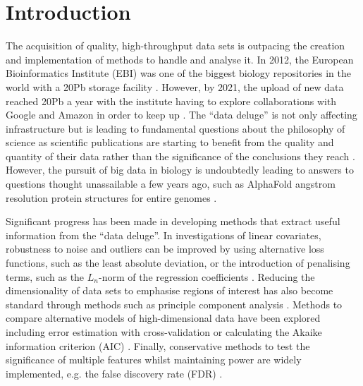 \documentclass[../main.tex]{subfiles}
\begin{document}
\chapter{{Introduction}}
\onehalfspacing

The acquisition of quality, high-throughput data sets is outpacing the creation and implementation of methods to handle and analyse it. 
In 2012, the European Bioinformatics Institute (EBI) was one of the biggest biology repositories in the world with a 20Pb storage facility \parencite{EBI2012}. 
However, by 2021, the upload of new data reached 20Pb a year with the institute having to explore collaborations with Google and Amazon in order to keep up \parencite{EBI2021}. 
The “data deluge” \parencite{Royal2012} is not only affecting infrastructure but is leading to fundamental questions about the philosophy of science as scientific publications are starting to benefit from the quality and quantity of their data rather than the significance of the conclusions they reach \parencite{Leonelli2019, Botstein2010}. 
However, the pursuit of big data in biology is undoubtedly leading to answers to questions thought unassailable a few years ago, such as AlphaFold angstrom resolution protein structures for entire genomes \parencite{Jumper2021}. 

Significant progress has been made in developing methods that extract useful information from the “data deluge”.
In investigations of linear covariates, robustness to noise and outliers can be improved by using alternative loss functions, such as the least absolute deviation, or the introduction of penalising terms, such as the $L_n$-norm of the regression coefficients \parencite{Wu2015}.
Reducing the dimensionality of data sets to emphasise regions of interest has also become standard through methods such as principle component analysis \parencite{Wall2005}.  
Methods to compare alternative models of high-dimensional data have been explored including error estimation with cross-validation \parencite{Molinaro2005} or calculating the Akaike information criterion (AIC) \parencite{Akaike1998}.
Finally, conservative methods to test the significance of multiple features whilst maintaining power are widely implemented, e.g. the false discovery rate (FDR) \parencite{Benjamini1995}.
\end{document}
